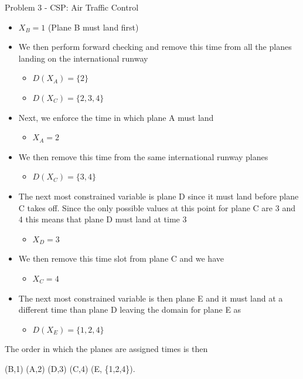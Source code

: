 \begin{problem}{Problem 3 - CSP: Air Traffic Control}
\begin{highlight}
        \begin{itemize}
            \item $X_{B} = 1$ (Plane B must land first)
            \item We then perform forward checking and remove this time from all the planes landing on the international runway
            \begin{itemize}
                \item $D(X_{A}) = \{2\}$
                \item $D(X_{C}) = \{2,3,4\}$
            \end{itemize}
            \item Next, we enforce the time in which plane A must land
            \begin{itemize}
                \item $X_{A} = 2$
            \end{itemize}
            \item We then remove this time from the same international runway planes
            \begin{itemize}
                \item $D(X_{C}) = \{3,4\}$
            \end{itemize}
            \item The next most constrained variable is plane D since it must land before plane C takes off. Since the only possible values at this point for plane C are 3 and 4 this means that plane D
            must land at time 3
            \begin{itemize}
                \item $X_{D} = 3$
            \end{itemize}
            \item We then remove this time slot from plane C and we have
            \begin{itemize}
                \item $X_{C} = 4$
            \end{itemize}
            \item The next most constrained variable is then plane E and it must land at a different time than plane D leaving the domain for plane E as
            \begin{itemize}
                \item $D(X_{E}) = \{1,2,4\}$
            \end{itemize}
        \end{itemize}
        The order in which the planes are assigned times is then

        \begin{center}
            \begin{highlightbox}
                (B,1) \rightarrow (A,2) \rightarrow (D,3) \rightarrow (C,4) \rightarrow (E, \{1,2,4\}).
            \end{highlightbox}
        \end{center}
    \end{highlight}

\end{problem}

